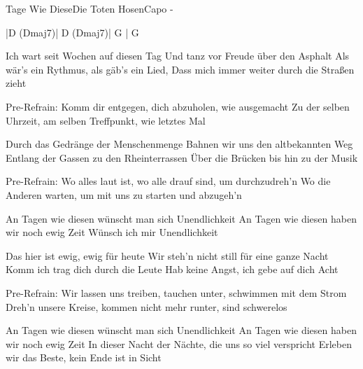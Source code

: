 \begin{song}{Tage Wie Diese}{Die Toten Hosen}{Capo -}

|D (Dmaj7)| D (Dmaj7)| G    | G

Ich wart seit Wochen auf diesen Tag
Und tanz vor Freude über den Asphalt
Als wär's ein Rythmus, als gäb's ein Lied,
Dass mich immer weiter durch die Straßen zieht

Pre-Refrain:
Komm dir entgegen, dich abzuholen, wie ausgemacht
Zu der selben Uhrzeit, am selben Treffpunkt, wie letztes Mal

Durch das Gedränge der Menschenmenge
Bahnen wir uns den altbekannten Weg
Entlang der Gassen zu den Rheinterrassen
Über die Brücken bis hin zu der Musik

Pre-Refrain:
Wo alles laut ist, wo alle drauf sind, um durchzudreh'n
Wo die Anderen warten, um mit uns zu starten und abzugeh'n

An Tagen wie diesen wünscht man sich Unendlichkeit
An Tagen wie diesen haben wir noch ewig Zeit
Wünsch ich mir Unendlichkeit

Das hier ist ewig, ewig für heute
Wir steh'n nicht still für eine ganze Nacht
Komm ich trag dich durch die Leute
Hab keine Angst, ich gebe auf dich Acht

Pre-Refrain:
Wir lassen uns treiben, tauchen unter, schwimmen mit dem Strom
Dreh'n unsere Kreise, kommen nicht mehr runter, sind schwerelos

An Tagen wie diesen wünscht man sich Unendlichkeit
An Tagen wie diesen haben wir noch ewig Zeit
In dieser Nacht der Nächte, die uns so viel verspricht
Erleben wir das Beste,  kein Ende ist in Sicht


\end{song}

